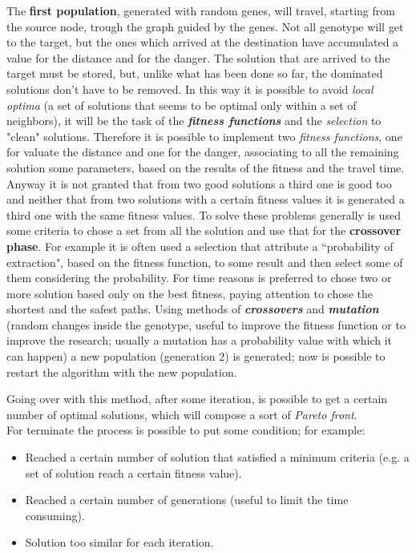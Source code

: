 \documentclass[a4paper,11pt]{report}
\begin{document}
The \textbf{first population}, generated with random genes, will travel, starting from the source node, trough the graph guided by the genes. Not all genotype will get to the target, but the ones which arrived at the destination have accumulated a value for the distance and for the danger.
The solution that are arrived to the target must be stored, but, unlike what has been done so far, the dominated solutions don't have to be removed. In this way it is possible to avoid \textit{local optima} (a set of solutions that seems to be optimal only within a set of neighbors), it will be the task of the \textit{\textbf{fitness functions}} and the \textit{selection} to "clean" solutions. 
Therefore it is possible to implement two \textit{fitness functions}, one for valuate the distance and one for the danger, associating to all the remaining solution some parameters, based on the results of the fitness and the travel time.
Anyway it is not granted that from two good solutions a third one is good too and neither that from two solutions with a certain fitness values it is generated a third one with the same fitness values. To solve these problems generally is used some criteria to chose a set from all the solution and use that for the \textbf{crossover phase}.
For example it is often used a selection that attribute a ``probability of extraction", based on the fitness function, to some result and then select some of them considering the probability.
For time reasons is preferred to chose two or more solution based only on the best fitness, paying attention to chose the shortest and the safest paths.
Using methods of \textbf{\textit{crossovers}} and \textbf{\textit{mutation}} (random changes inside the genotype, useful to improve the fitness function or to improve the research; usually a mutation has a probability value with which it can happen) a new population (generation 2) is generated; now is possible to restart the algorithm with the new population. 

Going over with this method, after some iteration, is possible to get a certain number of optimal solutions, which will compose a sort of \textit{Pareto front}.\\
For terminate the process is possible to put some condition; for example:
\begin{itemize}
	\item Reached a certain number of solution that satisfied a minimum criteria (e.g. a set of solution reach a certain fitness value).
	\item Reached a certain number of generations (useful to limit the time consuming).
	\item  Solution too similar for each iteration.
\end{itemize}
\end{document}

